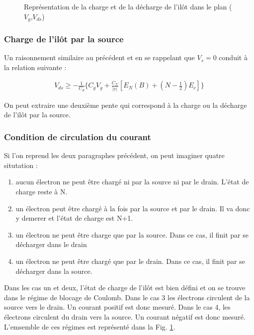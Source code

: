 \begin{figure}
\caption{Représentation de la charge et de la décharge de l'il\^ot dans le plan ($V_g$,$V_{ds}$)}
\label{charge_discharge}
\end{figure}



\subsubsection{Charge de l'il\^ot par la source}
Un raisonnement similaire au précédent et en se rappelant que $V_s = 0$ conduit à la relation suivante :

\begin{eqnarray}
V_{ds} \geq -\frac{1}{C_d} \{C_gV_g + \frac{C_{\Sigma}}{|e|}[E_N(B) + (N-\frac{1}{2})E_c] \}
\end{eqnarray}


On peut extraire une deuxième pente qui correspond à la charge ou la décharge de l'il\^ot par la source.


\subsubsection{Condition de circulation du courant}

Si l'on reprend les deux paragraphes précédent, on peut imaginer quatre situtation :
\begin{enumerate}
\item aucun électron ne peut \^etre chargé ni par la source ni par le drain. L'état de charge reste à N.
\item un électron peut \^etre chargé à la fois par la source et par le drain. Il va donc y demerer et l'état de charge est N+1.
\item un électron ne peut \^etre charge que par la source. Dans ce cas, il finit par se décharger dans le drain
\item un électron ne peut \^etre chargé que par le drain. Dans ce cas, il finit par se décharger dans la source.
\end{enumerate}
Dans les cas un et deux, l'état de charge de l'il\^ot est bien défini et on se trouve dans le régime de blocage de Coulomb. Dans le cas 3 les électrons circulent de la source vers le drain. Un courant positif est donc mesuré. Dans le cas 4, les électrons circulent du drain vers la source. Un courant négatif est donc mesuré. L'emsemble de ces régimes est représenté dans la Fig. \ref{charge_discharge}.








